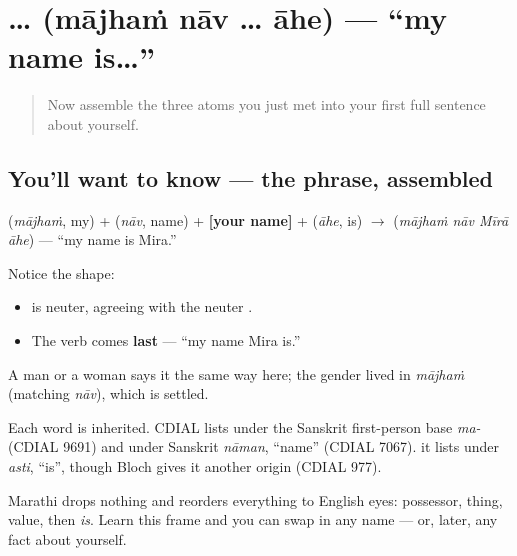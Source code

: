 \section[\texorpdfstring{\mr{माझं} \mr{नाव} … \mr{आहे} (mājhaṁ nāv … āhe)}{माझं नाव … आहे (mājhaṁ nāv … āhe)}]{  …  (mājhaṁ nāv … āhe) — \textquotedblleft{}my name is…\textquotedblright{}}

\label{lesson:MR-C02-majhe-naav-aahe}



\begin{quote}
Now assemble the three atoms you just met into your first full sentence about yourself.
\end{quote}

\subsection*{You'll want to know — the phrase, assembled}
\textbf{} (\emph{mājhaṁ}, my) + \textbf{} (\emph{nāv}, name) + \textbf{{[}your name{]}} + \textbf{} (\emph{āhe}, is) $\to$ \textbf{   } (\emph{mājhaṁ nāv Mīrā āhe}) — \textquotedblleft{}my name is Mira.\textquotedblright{}

Notice the shape:

\begin{itemize}
\raggedright
  \item \textbf{} is neuter, agreeing with the neuter \textbf{}.
  \item The verb \textbf{} comes \textbf{last} — \textquotedblleft{}my name Mira is.\textquotedblright{}
\end{itemize}

A man or a woman says it the same way here; the gender lived in \emph{mājhaṁ} (matching \emph{nāv}), which is settled.

\begin{cousinweb}
Each word is inherited. CDIAL lists \textbf{} under the Sanskrit first-person base \emph{ma-} (CDIAL 9691) and \textbf{} under Sanskrit \emph{nāman}, \textquotedblleft{}name\textquotedblright{} (CDIAL 7067). \textbf{} it lists under \emph{asti}, \textquotedblleft{}is\textquotedblright{}, though Bloch gives it another origin (CDIAL 977).
\end{cousinweb}

\begin{culture}
Marathi drops nothing and reorders everything to English eyes: possessor, thing, value, then \emph{is}. Learn this frame and you can swap in any name — or, later, any fact about yourself.
\end{culture}

